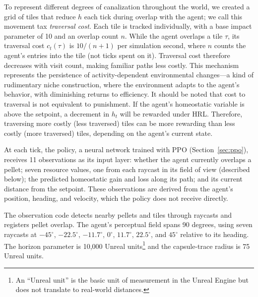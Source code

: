 \documentclass[12pt,fleqn]{article}
\begin{document}
To represent different degrees of canalization throughout the world, we created a grid of tiles that reduce \(h\) each tick during overlap with the agent; we call this movement tax \emph{traversal cost}. Each tile is tracked individually, with a base impact parameter of 10 and an overlap count \(n\). While the agent overlaps a tile \(\tau\), its traversal cost \(c_t(\tau)\) is \(10/(n+1)\) per simulation second, where \(n\) counts the agent's entries into the tile (not ticks spent on it). Traversal cost therefore decreases with visit count, making familiar paths less costly. This mechanism represents the persistence of activity-dependent environmental changes---a kind of rudimentary niche construction, where the environment adapts to the agent's behavior, with diminishing returns to efficiency. It should be noted that cost to traversal is not equivalent to punishment. If the agent's homeostatic variable is above the setpoint, a decrement in \(h_t\) will be rewarded under HRL. Therefore, traversing more costly (less traversed) tiles can be more rewarding than less costly (more traversed) tiles, depending on the agent's current state.

At each tick, the policy, a neural network trained with PPO (Section~\ref{sec:ppo}), receives 11 observations as its input layer: whether the agent currently overlaps a pellet; seven resource values, one from each raycast in its field of view (described below); the predicted homeostatic gain and loss along its path; and its current distance from the setpoint. These observations are derived from the agent's position, heading, and velocity, which the policy does not receive directly.

The observation code detects nearby pellets and tiles through raycasts and registers pellet overlap. The agent's perceptual field spans 90 degrees, using seven raycasts at $-45^\circ$, $-22.5^\circ$, $-11.7^\circ$, $0^\circ$, $11.7^\circ$, $22.5^\circ$, and $45^\circ$ relative to its heading. The horizon parameter is 10,000 Unreal units\footnote{An ``Unreal unit'' is the basic unit of measurement in the Unreal Engine but does not translate to real-world distances.} and the capsule-trace radius is 75 Unreal units.
\end{document}
